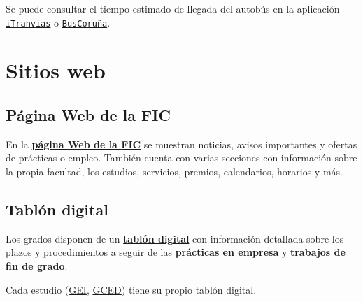 \begin{infoBox}
    Se puede consultar el tiempo estimado de llegada del autobús en la aplicación \href{https://tranviascoruna.com/}{\texttt{iTranvias}} o \href{https://buscoruna.eu/}{\texttt{BusCoruña}}.
\end{infoBox}


\section{Sitios web}

\subsection{Página Web de la FIC}

En  la \href{https://www.fic.udc.es/}{\textbf{página Web de la \acrshort{FIC}}} se muestran noticias, avisos importantes y ofertas de prácticas o empleo. También cuenta con varias secciones con información sobre la propia facultad, los estudios, servicios, premios, calendarios, horarios y más.

\FloatBarrier
\begin{figure}[htp]
    \centering
\end{figure}
\FloatBarrier

\subsection{Tablón digital}

Los grados disponen de un \textbf{\href{https://taboleirofic.udc.es/}{tablón digital}} con información detallada sobre los plazos y procedimientos a seguir de las \textbf{prácticas en empresa} y \textbf{trabajos de fin de grado}.

\begin{infoBox}
    Cada estudio (\href{\linkTaboleiroGEI}{\acrshort{GEI}}, \href{\linkTaboleiroGCED}{\acrshort{GCED}}) tiene su propio tablón digital.
\end{infoBox}

